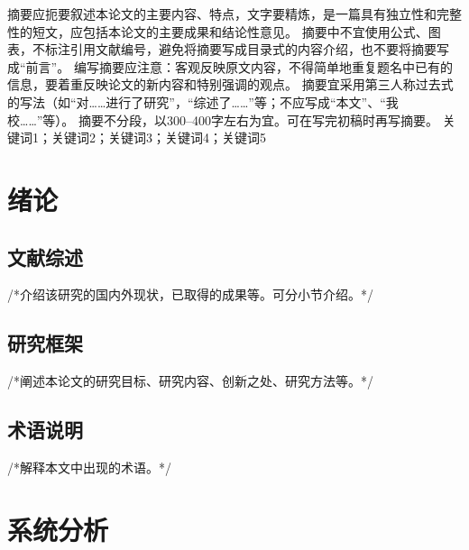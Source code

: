 \documentclass{jnuthesis}
\begin{document}
\renewcommand{\title}{A thesis class for Jinan University} %
\renewcommand{\biaoti}{暨南大学课程论文模板}  %
\renewcommand{\mingcheng}{《课程论文写作》}
\renewcommand{\leibie}{通识教育必修课}
\renewcommand{\xingming}{暨小小}
\renewcommand{\xuehao}{2021123456}
\renewcommand{\xueyuan}{信息科学技术学院}
\renewcommand{\xuexi}{计算机科学系}
\renewcommand{\zhuanye}{网络空间安全}
\renewcommand{\jiaoshi}{暨大大}
\renewcommand{\danwei}{暨大大}



\begin{zhabstract}
\zhaiyao
摘要应扼要叙述本论文的主要内容、特点，文字要精炼，是一篇具有独立性和完整性的短文，应包括本论文的主要成果和结论性意见。
摘要中不宜使用公式、图表，不标注引用文献编号，避免将摘要写成目录式的内容介绍，也不要将摘要写成“前言”。
编写摘要应注意：客观反映原文内容，不得简单地重复题名中已有的信息，要着重反映论文的新内容和特别强调的观点。
摘要宜采用第三人称过去式的写法（如“对……进行了研究”，“综述了……”等；不应写成“本文”、“我校……”等）。
摘要不分段，以300--400字左右为宜。可在写完初稿时再写摘要。
\guanjianci
关键词1；关键词2；关键词3；关键词4；关键词5
\end{zhabstract}

\chapter{绪论}

\section{文献综述}

/*介绍该研究的国内外现状，已取得的成果等。可分小节介绍。*/

\section{研究框架}

/*阐述本论文的研究目标、研究内容、创新之处、研究方法等。*/

\section{术语说明}

/*解释本文中出现的术语。*/

\chapter{系统分析}
\end{document}
